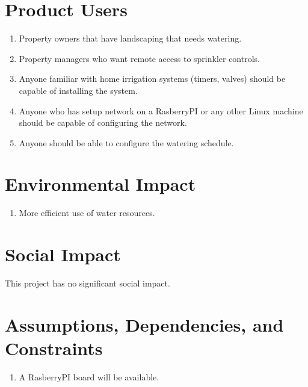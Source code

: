 \documentclass[12pt,letterpaper]{article}
\begin{document}
\pagebreak

\section{Product Users}

\begin{enumerate}
\item Property owners that have landscaping that needs watering.
\item Property managers who want remote access to sprinkler controls.
\item Anyone familiar with home irrigation systems (timers, valves)
should be capable of installing the system.
\item Anyone who has setup network on a RasberryPI or any other Linux
machine should be capable of configuring the network.
\item Anyone should be able to configure the watering schedule.
\end{enumerate}


\section{Environmental Impact}

\begin{enumerate}
\item More efficient use of water resources.
\end{enumerate}

\section{Social Impact}

This project has no significant social impact.


\section{Assumptions, Dependencies, and Constraints}

\begin{enumerate}
\item A RasberryPI board will be available.
\end{enumerate}

\end{document}
